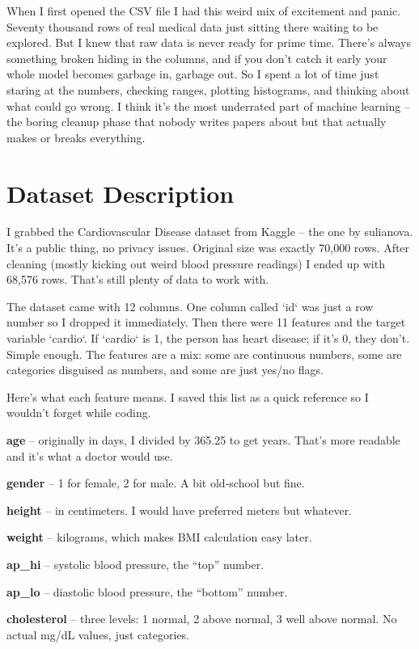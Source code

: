 \documentclass[11pt, a4paper, oneside]{book}
\begin{document}
When I first opened the CSV file I had this weird mix of excitement and panic. Seventy thousand rows of real medical data just sitting there waiting to be explored. But I knew that raw data is never ready for prime time. There’s always something broken hiding in the columns, and if you don’t catch it early your whole model becomes garbage in, garbage out. So I spent a lot of time just staring at the numbers, checking ranges, plotting histograms, and thinking about what could go wrong. I think it’s the most underrated part of machine learning – the boring cleanup phase that nobody writes papers about but that actually makes or breaks everything.

\section{Dataset Description}
I grabbed the Cardiovascular Disease dataset from Kaggle – the one by sulianova. It’s a public thing, no privacy issues. Original size was exactly 70,000 rows. After cleaning (mostly kicking out weird blood pressure readings) I ended up with 68,576 rows. That’s still plenty of data to work with.

The dataset came with 12 columns. One column called `id` was just a row number so I dropped it immediately. Then there were 11 features and the target variable `cardio`. If `cardio` is 1, the person has heart disease; if it’s 0, they don’t. Simple enough. The features are a mix: some are continuous numbers, some are categories disguised as numbers, and some are just yes/no flags.

Here’s what each feature means. I saved this list as a quick reference so I wouldn’t forget while coding.

\textbf{age} – originally in days, I divided by 365.25 to get years. That’s more readable and it’s what a doctor would use.

\textbf{gender} – 1 for female, 2 for male. A bit old‑school but fine.

\textbf{height} – in centimeters. I would have preferred meters but whatever.

\textbf{weight} – kilograms, which makes BMI calculation easy later.

\textbf{ap\_hi} – systolic blood pressure, the “top” number.

\textbf{ap\_lo} – diastolic blood pressure, the “bottom” number.

\textbf{cholesterol} – three levels: 1 normal, 2 above normal, 3 well above normal. No actual mg/dL values, just categories.
\end{document}
